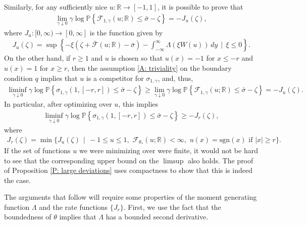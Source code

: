 \documentclass[12pt]{amsart}
\begin{document}
Similarly, for any sufficiently nice $u : \mathbb{R} \to [-1,1]$, it is possible to prove that
	\begin{align*}
		\lim_{ \gamma \downarrow 0 } \gamma \log \mathbb{P} \left\{ \mathscr{F}_{1,\gamma}(u; \mathbb{R}) \leq \bar{\sigma} - \zeta \right\} = -J_{u}(\zeta),
	\end{align*}
where $J_{u} : [0,\infty) \to [0,\infty]$ is the function given by 
	\begin{align} \label{E: Ju function}
		J_{u}(\zeta) = \sup \left\{ - \xi ( \zeta + \bar{\mathscr{F}}(u;\mathbb{R}) - \bar{\sigma} ) - \int_{-\infty}^{\infty} \Lambda( \xi W(u) ) \, dy \, \mid \, \xi \leq 0 \right\}.
	\end{align}
On the other hand, if $r \geq 1$ and $u$ is chosen so that $u(x) = -1$ for $x \leq -r$ and $u(x) = 1$ for $x \geq r$, then the assumption \eqref{A: triviality} on the boundary condition $q$ implies that $u$ is a competitor for $\sigma_{1,\gamma}$, and, thus,
	\begin{align*}
		\liminf_{ \gamma \downarrow 0 } \gamma \log \mathbb{P} \left\{ \sigma_{1,\gamma}(1,[-r,r]) \leq \bar{\sigma} - \zeta \right \} \geq \lim_{ \gamma \downarrow 0 } \gamma \log \mathbb{P} \left\{ \mathscr{F}_{1,\gamma}(u;\mathbb{R}) \leq \bar{\sigma} - \zeta \right\} = - J_{u}(\zeta).
	\end{align*}
In particular, after optimizing over $u$, this implies
	\begin{gather}
		\liminf_{ \gamma \downarrow 0 } \gamma \log \mathbb{P} \left\{ \sigma_{1,\gamma}(1,[-r,r]) \leq \bar{\sigma} - \zeta \right \} \geq - J_{r}(\zeta), \nonumber 
	\end{gather}
	where	%
	\begin{gather}
		J_{r}(\zeta) = \min \{ J_{u}(\zeta) \, \mid \, -1 \leq u \leq 1, \, \, \mathscr{F}_{\theta_{*}}(u;\mathbb{R}) < \infty, \, \, u(x) = \text{sgn}(x) \, \, \text{if} \, \, |x| \geq r \}. \label{E: definition of Jr}
	\end{gather}
If the set of functions $u$ we were minimizing over were finite, it would not be hard to see that the corresponding upper bound on the $\limsup$ also holds.  The proof of Proposition \ref{P: large deviations} uses compactness  to show that this is indeed the case.

The arguments that follow will require some properties of the moment generating function $\Lambda$ and the rate functions $\{ J_{r} \}$.  First, we use the fact that the boundedness of $\theta$ implies that $\Lambda$ has a bounded second derivative.
\end{document}

